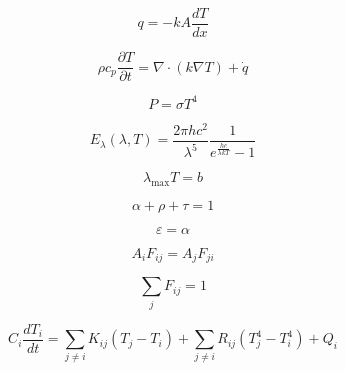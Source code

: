 \begin{equation} \label{eq:01}
    q = -kA \frac{dT}{dx}
\end{equation}

\begin{equation} \label{eq:02}
    \rho c_p \frac{\partial T}{\partial t} = \nabla \cdot (k \nabla T) + \dot{q} 
\end{equation}

\begin{equation}
    P = \sigma T^{4}
\end{equation}

\begin{equation}
    E_{\lambda}(\lambda, T) = 
\frac{2\pi h c^{2}}{\lambda^{5}} 
\frac{1}{e^{\frac{hc}{\lambda k T}} - 1}
\end{equation}

\begin{equation}
    \lambda_{\text{max}} T = b
\end{equation}

\begin{equation}
    \alpha + \rho + \tau = 1
\end{equation}

\begin{equation}
    \varepsilon = \alpha
\end{equation}

\begin{equation}
    A_i F_{ij} = A_j F_{ji}
\end{equation}

\begin{equation}
    \sum_{j} F_{ij} = 1
\end{equation}

\begin{equation}
    C_i \frac{dT_i}{dt}
= 
\sum_{j \neq i} K_{ij} (T_j - T_i)
+
\sum_{j \neq i} R_{ij} (T_j^4 - T_i^4)
+
Q_i
\end{equation}

